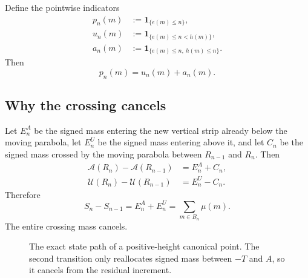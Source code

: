 \documentclass[11pt]{article}
\theoremstyle{definition}
\theoremstyle{remark}
\newcommand{\1}{\mathbf{1}}
\begin{document}
Define the pointwise indicators
\begin{align}
 p_n(m)&:=\1_{\{e(m)\le n\}},
 \label{eq:p-indicator}\\
 u_n(m)&:=\1_{\{e(m)\le n<h(m)\}},
 \label{eq:u-indicator}\\
 a_n(m)&:=\1_{\{e(m)\le n,\ h(m)\le n\}}.
 \label{eq:a-indicator}
\end{align}
Then
\begin{equation}
 \boxed{p_n(m)=u_n(m)+a_n(m).}
 \label{eq:temporal-partition}
\end{equation}

\subsection{Why the crossing cancels}

Let $E_n^A$ be the signed mass entering the new vertical strip already below the moving parabola, let $E_n^U$ be the signed mass entering above it, and let $C_n$ be the signed mass crossed by the moving parabola between $R_{n-1}$ and $R_n$.  Then
\begin{align}
 \mathcal A(R_n)-\mathcal A(R_{n-1})
 &=E_n^A+C_n,
 \label{eq:Delta-A}\\
 \mathcal U(R_n)-\mathcal U(R_{n-1})
 &=E_n^U-C_n.
 \label{eq:Delta-U}
\end{align}
Therefore
\begin{equation}
 \boxed{
 S_n-S_{n-1}
 =E_n^A+E_n^U
 =\sum_{m\in B_n}\mu(m).
 }
 \label{eq:Delta-S}
\end{equation}
The entire crossing mass cancels.

\begin{figure}[htbp]
\centering
{}
\caption{The exact state path of a positive-height canonical point.  The second transition only reallocates signed mass between $-T$ and $A$, so it cancels from the residual increment.}
\label{fig:state-path}
\end{figure}
\end{document}
